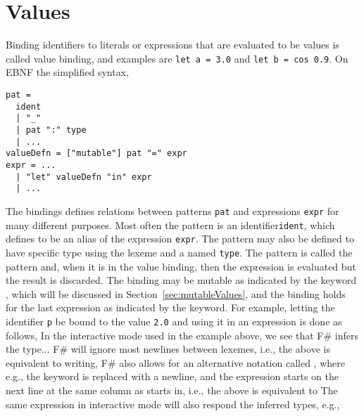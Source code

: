 \section{Values}
Binding identifiers to literals or expressions that are evaluated to be values is called value binding, and examples are \lstinline!let a = 3.0! and \lstinline!let b = cos 0.9!. On EBNF the simplified syntax,
%
\begin{lstlisting}[language=ebnf]
pat = 
  ident 
  | "_"
  | pat ":" type
  | ...
valueDefn = ["mutable"] pat "=" expr
expr = ... 
  | "let" valueDefn "in" expr  
  | ...
\end{lstlisting}
The  bindings defines relations between patterns \lstinline[language=ebnf]!pat! and expressions \lstinline[language=ebnf]!expr! for many different purposes. Most often the pattern is an identifier\lstinline[language=ebnf]!ident!, which  defines to be an alias of the expression \lstinline[language=ebnf]!expr!. The pattern may also be defined to have specific type using the \idx{\lexeme{:}} lexeme and a named \lstinline[language=ebnf]!type!. The \lexeme{\_} pattern is called the  pattern and, when it is in the value binding, then the expression is evaluated but the result is discarded. The binding may be mutable as indicated by the keyword , which will be discussed in Section~\ref{sec:mutableValues}, and the binding holds  for the last expression as indicated by the  keyword. For example, letting the identifier \lstinline!p! be bound to the value \lstinline!2.0! and using it in an expression is done as follows,
%
%
In the interactive mode used in the example above, we see that F\# infers the type...
F\# will ignore most newlines between lexemes, i.e., the above is equivalent to writing,
%
%
F\# also allows for an alternative notation called , where e.g., the  keyword is replaced with a newline, and the expression starts on the next line at the same column as  starts in, i.e., the above is equivalent to
%
%
The same expression in interactive mode will also respond the inferred types, e.g.,
